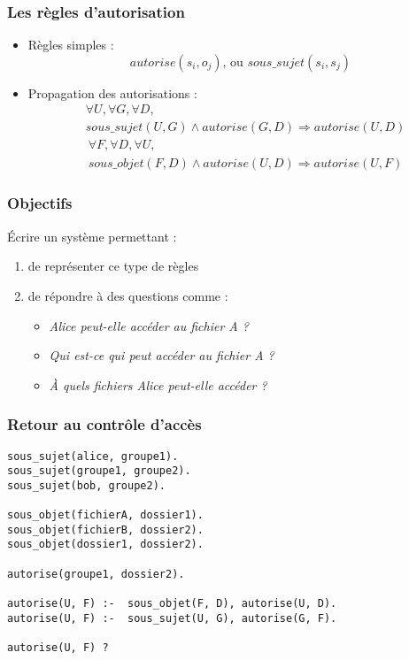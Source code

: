 \documentclass[aspectratio=43]{beamer}
\begin{document}
\begin{frame}
  \frametitle{Les règles d'autorisation}
  \begin{itemize}
  \item Règles simples :
    $$autorise(s_{i}, o_{j})\textrm{, ou }sous\_sujet(s_{i}, s_{j})$$
  \item Propagation des autorisations :
    \begin{align*}
      &\forall U, \forall G, \forall D, \\
      &sous\_sujet(U, G) \wedge autorise(G, D) \Rightarrow autorise(U, D)
    \end{align*}
    \begin{align*}
      &\forall F, \forall D, \forall U, \\
      &sous\_objet(F, D) \wedge autorise(U, D) \Rightarrow autorise(U, F)
    \end{align*}
  \end{itemize}  
\end{frame}

\begin{frame}
  \frametitle{Objectifs}
  
  Écrire un système permettant :
  \begin{enumerate}
  \item de représenter ce type de règles
  \item de répondre à des questions comme :
    \begin{itemize}
    \item \it{Alice peut-elle accéder au fichier A ?}
    \item \it{Qui est-ce qui peut accéder au fichier A ?}
    \item \it{À quels fichiers Alice peut-elle accéder ?}
    \end{itemize}
  \end{enumerate}
\end{frame}


\begin{frame}[fragile]
  \frametitle{Retour au contrôle d'accès}
  \begin{verbatim}
sous_sujet(alice, groupe1).
sous_sujet(groupe1, groupe2).
sous_sujet(bob, groupe2).

sous_objet(fichierA, dossier1).
sous_objet(fichierB, dossier2).
sous_objet(dossier1, dossier2).

autorise(groupe1, dossier2).

autorise(U, F) :-  sous_objet(F, D), autorise(U, D).
autorise(U, F) :-  sous_sujet(U, G), autorise(G, F).

autorise(U, F) ?
  \end{verbatim}
\end{frame}
\end{document}
